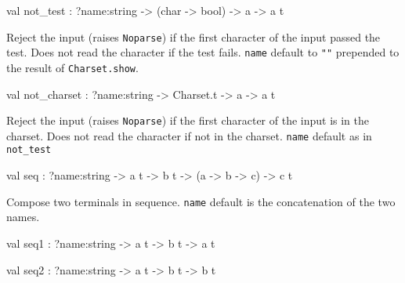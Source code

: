 \documentclass[11pt]{article}
\begin{document}
\label{val:Lex.not-underscoretest}\begin{ocamldoccode}
val not_test : ?name:string -> (char -> bool) -> {\textquotesingle}a -> {\textquotesingle}a t
\end{ocamldoccode}
\begin{ocamldocdescription}
Reject the input (raises {\tt{Noparse}}) if the first character of the input
    passed the test. Does not read the character if the test fails.
    {\tt{name}} default to {\tt{"{}"}} prepended to the result of {\tt{Charset.show}}.


\end{ocamldocdescription}




\label{val:Lex.not-underscorecharset}\begin{ocamldoccode}
val not_charset : ?name:string -> Charset.t -> {\textquotesingle}a -> {\textquotesingle}a t
\end{ocamldoccode}
\begin{ocamldocdescription}
Reject the input (raises {\tt{Noparse}}) if the first character of the input
    is in the charset. Does not read the character if not in the charset.
    {\tt{name}} default as in {\tt{not\_test}}


\end{ocamldocdescription}




\label{val:Lex.seq}\begin{ocamldoccode}
val seq : ?name:string -> {\textquotesingle}a t -> {\textquotesingle}b t -> ({\textquotesingle}a -> {\textquotesingle}b -> {\textquotesingle}c) -> {\textquotesingle}c t
\end{ocamldoccode}
\begin{ocamldocdescription}
Compose two terminals in sequence. {\tt{name}} default is the concatenation
    of the two names.


\end{ocamldocdescription}




\label{val:Lex.seq1}\begin{ocamldoccode}
val seq1 : ?name:string -> {\textquotesingle}a t -> {\textquotesingle}b t -> {\textquotesingle}a t
\end{ocamldoccode}




\label{val:Lex.seq2}\begin{ocamldoccode}
val seq2 : ?name:string -> {\textquotesingle}a t -> {\textquotesingle}b t -> {\textquotesingle}b t
\end{ocamldoccode}
\end{document}
